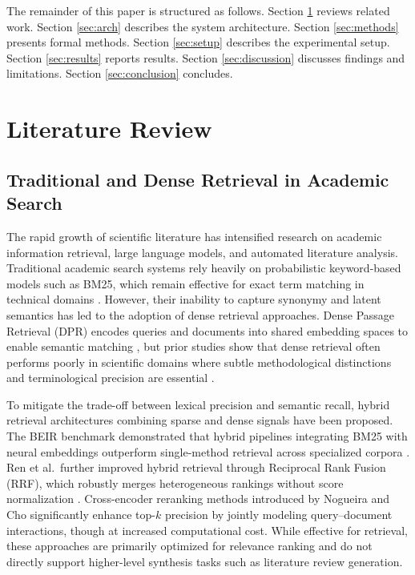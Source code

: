 \documentclass[conference,10pt,twocolumn]{IEEEtran}
\begin{document}
The remainder of this paper is structured as follows. Section \ref{sec:litreview} reviews related work. Section \ref{sec:arch} describes the system architecture. Section \ref{sec:methods} presents formal methods. Section \ref{sec:setup} describes the experimental setup. Section \ref{sec:results} reports results. Section \ref{sec:discussion} discusses findings and limitations. Section \ref{sec:conclusion} concludes.

\section{Literature Review}
\label{sec:litreview}

\subsection{Traditional and Dense Retrieval in Academic Search}

The rapid growth of scientific literature has intensified research on academic information retrieval, large language models, and automated literature analysis. Traditional academic search systems rely heavily on probabilistic keyword-based models such as BM25, which remain effective for exact term matching in technical domains \cite{robertson2009bm25}. However, their inability to capture synonymy and latent semantics has led to the adoption of dense retrieval approaches. Dense Passage Retrieval (DPR) encodes queries and documents into shared embedding spaces to enable semantic matching \cite{karpukhin2020dpr}, but prior studies show that dense retrieval often performs poorly in scientific domains where subtle methodological distinctions and terminological precision are essential \cite{bolanos2024ai}.

To mitigate the trade-off between lexical precision and semantic recall, hybrid retrieval architectures combining sparse and dense signals have been proposed. The BEIR benchmark demonstrated that hybrid pipelines integrating BM25 with neural embeddings outperform single-method retrieval across specialized corpora \cite{thakur2021beir}. Ren et al.\ further improved hybrid retrieval through Reciprocal Rank Fusion (RRF), which robustly merges heterogeneous rankings without score normalization \cite{ren2022hybridrag}. Cross-encoder reranking methods introduced by Nogueira and Cho \cite{nogueira2019passage} significantly enhance top-$k$ precision by jointly modeling query--document interactions, though at increased computational cost. While effective for retrieval, these approaches are primarily optimized for relevance ranking and do not directly support higher-level synthesis tasks such as literature review generation.
\end{document}

